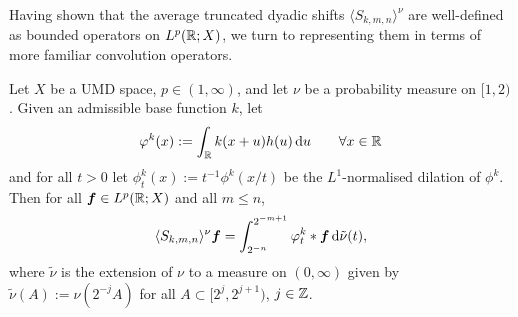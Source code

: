 Having shown that the average truncated dyadic shifts $\langle S_{k,m,n} \rangle^{\nu}$ are well-defined as bounded operators on $L^p(\mathbb{R};X)$, we turn to representing them in terms of more familiar convolution operators.

\begin{prop}\label{prop:shift-average-repn}
  Let $X$ be a UMD space, $p \in (1,\infty)$, and let $\nu$ be a probability measure on $[1,2)$.
  Given an admissible base function $k$, let
  \begin{equation}\label{eq:phik}
    \varphi^{k}(x) := \int_{\mathbb{R}} k(x+u)h(u) \, \mathrm{d} u \qquad \forall x \in \mathbb{R}
  \end{equation}
  and for all $t > 0$ let $\phi^{k}_{t}(x) := t^{-1}\phi^{k}(x/t)$ be the $L^1$-normalised dilation of $\phi^{k}$.
  Then for all $\bm{f} \in L^p(\mathbb{R};X)$ and all $m \leq n$,
  \begin{equation*}
    \langle S_{k,m,n} \rangle^{\nu} \bm{f} = \int_{2^{-n}}^{2^{-m+1}} \varphi_{t}^{k} \ast \bm{f} \, \mathrm{d}\tilde{\nu}(t),
  \end{equation*}
  where $\tilde{\nu}$ is the extension of $\nu$ to a measure on $(0,\infty)$ given by $\tilde{\nu}(A) := \nu(2^{-j}A)$ for all $A \subset [2^{j},2^{j+1})$, $j \in \mathbb{Z}$.
\end{prop}

